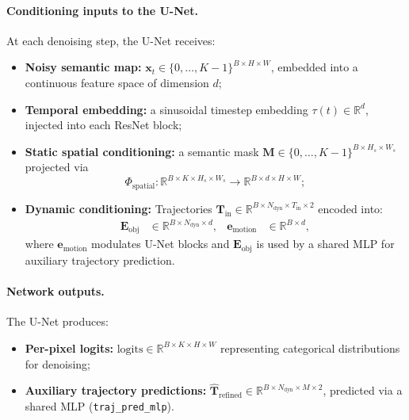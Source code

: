 \documentclass{article}
\begin{document}
\paragraph{Conditioning inputs to the U-Net.}
At each denoising step, the U-Net receives:
\begin{itemize}
  \item \textbf{Noisy semantic map:} $\mathbf{x}_t \in \{0,\ldots,K{-}1\}^{B\times H\times W}$, embedded into a continuous feature space of dimension $d$;
  \item \textbf{Temporal embedding:} a sinusoidal timestep embedding $\tau(t)\in\mathbb{R}^d$, injected into each ResNet block;
  \item \textbf{Static spatial conditioning:} a semantic mask $\mathbf{M}\in\{0,\dots,K{-}1\}^{B\times H_s\times W_s}$ projected via
  \[
    \Phi_{\text{spatial}}:\mathbb{R}^{B\times K\times H_s\times W_s} \to \mathbb{R}^{B\times d\times H\times W};
  \]
  \item \textbf{Dynamic conditioning:} Trajectories 
  $\mathbf{T}_{\text{in}}\in\mathbb{R}^{B\times N_{\text{dyn}}\times T_{\text{in}}\times 2}$ encoded into:
  \begin{align*}
    \mathbf{E}_{\text{obj}} &\in \mathbb{R}^{B\times N_{\text{dyn}}\times d}, &
    \mathbf{e}_{\text{motion}} &\in \mathbb{R}^{B\times d},
  \end{align*}
  where $\mathbf{e}_{\text{motion}}$ modulates U-Net blocks and $\mathbf{E}_{\text{obj}}$ is used by a shared MLP for auxiliary trajectory prediction.
\end{itemize}

\paragraph{Network outputs.}
The U-Net produces:
\begin{itemize}
  \item \textbf{Per-pixel logits:} $\mathrm{logits}\in\mathbb{R}^{B\times K\times H\times W}$ representing categorical distributions for denoising;
  \item \textbf{Auxiliary trajectory predictions:}
  $\widehat{\mathbf{T}}_{\text{refined}}\in\mathbb{R}^{B\times N_{\text{dyn}}\times M\times 2}$, predicted via a shared MLP (\texttt{traj\_pred\_mlp}).
\end{itemize}
\end{document}
